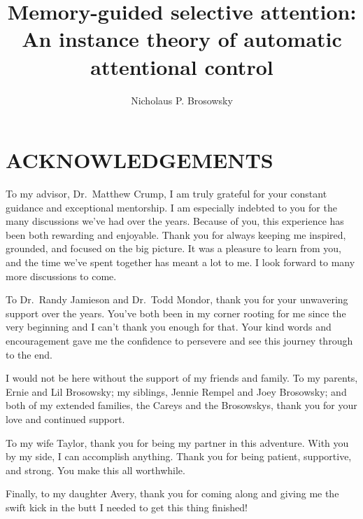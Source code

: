 \documentclass[]{DissertateCUNY}
\title{Memory-guided selective attention: An instance theory of automatic
attentional control}
\author{Nicholaus P. Brosowsky}
\date{}
\begin{document}
\maketitle

\copyrightpage
\approvalpage
\abstractpage

\newpage
{}
\fancyhead[R]{\thepage}
\fancyfoot[C]{}
\chapter*{ACKNOWLEDGEMENTS}

To my advisor, Dr.~Matthew Crump, I am truly grateful for your constant
guidance and exceptional mentorship. I am especially indebted to you for
the many discussions we've had over the years. Because of you, this
experience has been both rewarding and enjoyable. Thank you for always
keeping me inspired, grounded, and focused on the big picture. It was a
pleasure to learn from you, and the time we've spent together has meant
a lot to me. I look forward to many more discussions to come.

To Dr.~Randy Jamieson and Dr.~Todd Mondor, thank you for your unwavering
support over the years. You've both been in my corner rooting for me
since the very beginning and I can't thank you enough for that. Your
kind words and encouragement gave me the confidence to persevere and see
this journey through to the end.

I would not be here without the support of my friends and family. To my
parents, Ernie and Lil Brosowsky; my siblings, Jennie Rempel and Joey
Brosowsky; and both of my extended families, the Careys and the
Brosowskys, thank you for your love and continued support.

To my wife Taylor, thank you for being my partner in this adventure.
With you by my side, I can accomplish anything. Thank you for being
patient, supportive, and strong. You make this all worthwhile.

Finally, to my daughter Avery, thank you for coming along and giving me
the swift kick in the butt I needed to get this thing finished!

\newpage
{}
\fancyhead[R]{\thepage}
\fancyfoot[C]{}
\tableofcontents

\newpage
{}
\fancyhead[R]{\thepage}
\fancyfoot[C]{}
\listoftables

\newpage
{}
\fancyhead[R]{\thepage}
\fancyfoot[C]{}
\listoffigures
\end{document}
